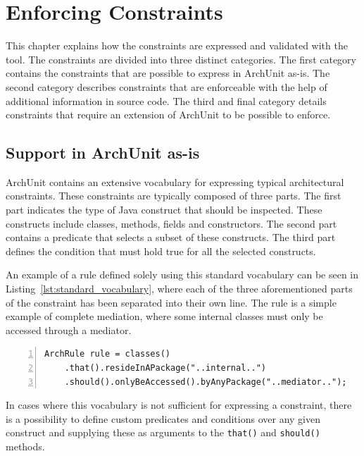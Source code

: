 \chapter{Enforcing Constraints}

This chapter explains how the constraints are expressed and validated with the tool. The constraints are divided into three distinct categories. The first category contains the constraints that are possible to express in ArchUnit as-is. The second category describes constraints that are enforceable with the help of additional information in source code. The third and final category details constraints that require an extension of ArchUnit to be possible to enforce.

\section{Support in ArchUnit as-is}

ArchUnit contains an extensive vocabulary for expressing typical architectural constraints. These constraints are typically composed of three parts. The first part indicates the type of Java construct that should be inspected. These constructs include classes, methods, fields and constructors. The second part contains a predicate that selects a subset of these constructs. The third part defines the condition that must hold true for all the selected constructs.

An example of a rule defined solely using this standard vocabulary can be seen in Listing~\ref{lst:standard_vocabulary}, where each of the three aforementioned parts of the constraint has been separated into their own line. The rule is a simple example of complete mediation, where some internal classes must only be accessed through a mediator.

\begin{minipage}{\linewidth}
\begin{lstlisting}[caption={Example of a rule that is expressed with the standard vocabulary.}, captionpos=b, label=lst:standard_vocabulary, numbers=left]
ArchRule rule = classes()
    .that().resideInAPackage("..internal..")
    .should().onlyBeAccessed().byAnyPackage("..mediator..");
\end{lstlisting}
\end{minipage}

In cases where this vocabulary is not sufficient for expressing a constraint, there is a possibility to define custom predicates and conditions over any given construct and supplying these as arguments to the \texttt{that()} and \texttt{should()} methods.

